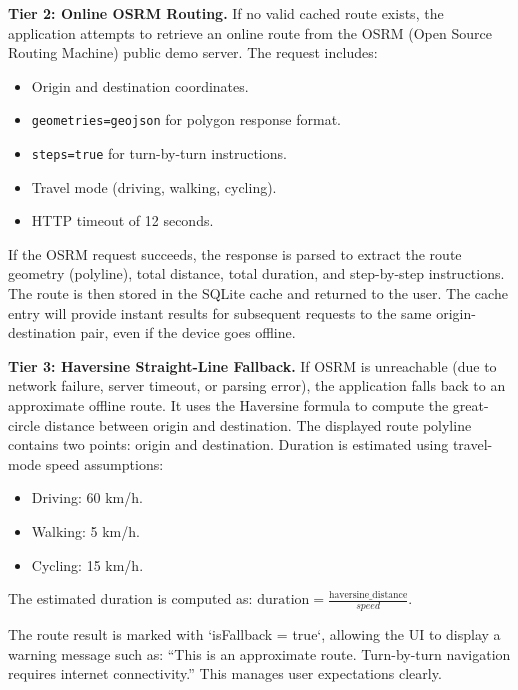 \documentclass[12pt,a4paper,oneside]{report}
\begin{document}
\textbf{Tier 2: Online OSRM Routing.} If no valid cached route exists, the application attempts to retrieve an online route from the OSRM (Open Source Routing Machine) public demo server. The request includes:

\begin{itemize}
\item Origin and destination coordinates.
\item \texttt{geometries=geojson} for polygon response format.
\item \texttt{steps=true} for turn-by-turn instructions.
\item Travel mode (driving, walking, cycling).
\item HTTP timeout of 12 seconds.
\end{itemize}

If the OSRM request succeeds, the response is parsed to extract the route geometry (polyline), total distance, total duration, and step-by-step instructions. The route is then stored in the SQLite cache and returned to the user. The cache entry will provide instant results for subsequent requests to the same origin-destination pair, even if the device goes offline.

\textbf{Tier 3: Haversine Straight-Line Fallback.} If OSRM is unreachable (due to network failure, server timeout, or parsing error), the application falls back to an approximate offline route. It uses the Haversine formula to compute the great-circle distance between origin and destination. The displayed route polyline contains two points: origin and destination. Duration is estimated using travel-mode speed assumptions:

\begin{itemize}
\item Driving: 60 km/h.
\item Walking: 5 km/h.
\item Cycling: 15 km/h.
\end{itemize}

The estimated duration is computed as: $\text{duration} = \frac{\text{haversine\_distance}}{speed}$.

The route result is marked with `isFallback = true`, allowing the UI to display a warning message such as: ``This is an approximate route. Turn-by-turn navigation requires internet connectivity.'' This manages user expectations clearly.
\end{document}
